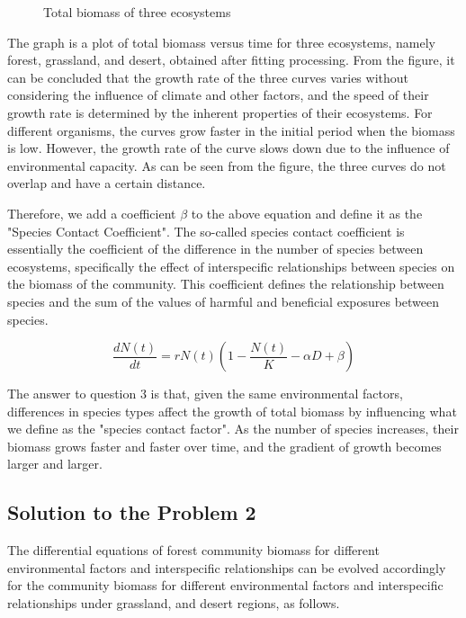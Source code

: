 \documentclass[12pt]{article}
\begin{document}
\begin{figure}[htb]
	\centering
	
	\caption{Total biomass of three ecosystems}
	\label{fig:three}
\end{figure}

The graph is a plot of total biomass versus time for three ecosystems, namely forest, grassland, and desert, obtained after fitting processing. From the figure, it can be concluded that the growth rate of the three curves varies without considering the influence of climate and other factors, and the speed of their growth rate is determined by the inherent properties of their ecosystems. For different organisms, the curves grow faster in the initial period when the biomass is low. However, the growth rate of the curve slows down due to the influence of environmental capacity. As can be seen from the figure, the three curves do not overlap and have a certain distance.

Therefore, we add a coefficient $\beta$ to the above equation and define it as the "Species Contact Coefficient". The so-called species contact coefficient is essentially the coefficient of the difference in the number of species between ecosystems, specifically the effect of interspecific relationships between species on the biomass of the community. This coefficient defines the relationship between species and the sum of the values of harmful and beneficial exposures between species.

\begin{equation}
	\frac{dN(t)}{dt} = rN(t)(1-\frac{N(t)}{K} - \alpha D+ \beta)
\end{equation}

The answer to question 3 is that, given the same environmental factors, differences in species types affect the growth of total biomass by influencing what we define as the "species contact factor". As the number of species increases, their biomass grows faster and faster over time, and the gradient of growth becomes larger and larger.

\subsection{Solution to the Problem 2}

The differential equations of forest community biomass for different environmental factors and interspecific relationships can be evolved accordingly for the community biomass for different environmental factors and interspecific relationships under grassland, and desert regions, as follows.
\end{document}
